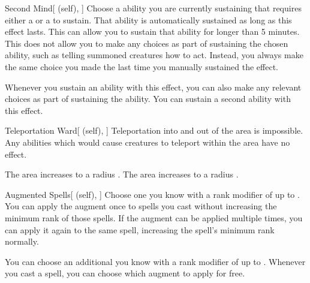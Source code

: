 \lowercase{\hypertarget{spell:Second Mind}{}}\label{spell:Second Mind}
\begin{attuneability}[Rank 4]{\hypertarget{spell:Second Mind}{Second Mind}}[ (self), ]
Choose a  ability you are currently sustaining that requires either a  or a  to sustain.
That ability is automatically sustained as long as this effect lasts.
This can allow you to sustain that ability for longer than 5 minutes.
This does not allow you to make any choices as part of sustaining the chosen ability, such as telling summoned creatures how to act.
Instead, you always make the same choice you made the last time you manually sustained the effect.

\rankline
{} Whenever you sustain an ability with this effect, you can also make any relevant choices as part of sustaining the ability.
 You can sustain a second ability with this effect.
\end{attuneability}
\vspace{0.25em}



\lowercase{\hypertarget{spell:Teleportation Ward}{}}\label{spell:Teleportation Ward}
\begin{attuneability}[Rank 4]{\hypertarget{spell:Teleportation Ward}{Teleportation Ward}}[ (self), ]
Teleportation into and out of the area is impossible.
Any abilities which would cause creatures to teleport within the area have no effect.

\rankline
{} The area increases to a \areahuge radius .
 The area increases to a \areaext radius .
\end{attuneability}
\vspace{0.25em}



\lowercase{\hypertarget{spell:Augmented Spells}{}}\label{spell:Augmented Spells}
\begin{attuneability}[Rank 5]{\hypertarget{spell:Augmented Spells}{Augmented Spells}}[ (self), ]
Choose one  you know with a rank modifier of up to .
You can apply the augment once to spells you cast without increasing the minimum rank of those spells.
If the augment can be applied multiple times, you can apply it again to the same spell, increasing the spell's minimum rank normally.

\rankline
{} You can choose an additional  you know with a rank modifier of up to .
Whenever you cast a spell, you can choose which augment to apply for free.
\end{attuneability}
\vspace{0.25em}



